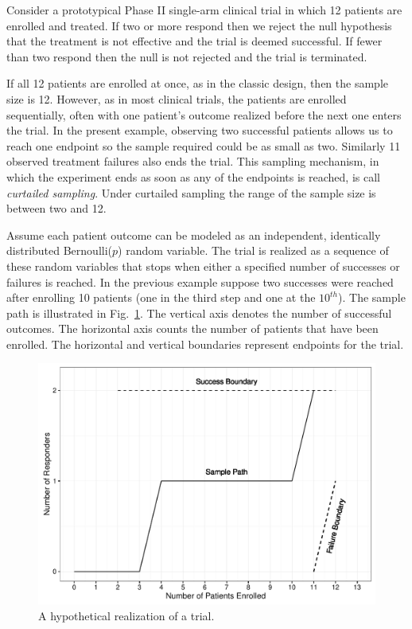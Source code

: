 \documentclass[review]{elsarticle}
\begin{document}
Consider a prototypical Phase II single-arm clinical trial in which 12 patients
are enrolled and treated. If two or more respond then we reject the null
hypothesis that the treatment is not effective and the trial is deemed
successful. If fewer than two respond then the null is not rejected and the 
trial is terminated.

If all 12 patients are enrolled at once, as in the classic
design, then the sample size is 12. However, as in most clinical trials, the
patients are enrolled sequentially, often with one patient's outcome realized
before the next one enters the trial. In the present example, observing two
successful patients allows us to reach one endpoint so the sample required
could be as small as two. Similarly 11
observed treatment failures also ends the trial. This sampling mechanism, in
which the experiment ends as soon as any of the endpoints is reached, is
call {\em curtailed sampling}. Under curtailed sampling the range of the
sample size is between two and 12.

Assume each patient outcome can be modeled as an independent,
identically distributed Bernoulli($p$) random variable. The trial is realized
as a sequence of these random variables that stops when either a
specified number of successes or failures is reached. In the
previous example suppose two successes were reached after enrolling 10
patients (one in the third step and one at the $10^{th}$). The sample
path is illustrated
in Fig.~\ref{fig:kane_viz}. The vertical axis denotes the number of
successful outcomes. The horizontal axis counts the number of patients that
have been enrolled. The horizontal and vertical boundaries represent
endpoints for the trial.

\begin{figure}[t!]
\includegraphics[width=\textwidth]{KanePlot.pdf}
\caption{
A hypothetical realization of a trial.
}
\label{fig:kane_viz}
\end{figure}
\end{document}
